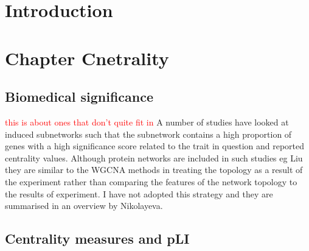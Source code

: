 \section{Introduction}

\section{Chapter Cnetrality}

\cite{newman2003social}
\cite{vasques2020transitivity}


\subsection{Biomedical significance}
\textcolor{red}{this is about ones that don't quite fit in}
A number of studies have looked at induced subnetworks such that the subnetwork contains a high proportion of genes with a high significance score related to the trait in question and reported centrality values. Although protein networks are included in such studies eg Liu they are similar to the WGCNA methods in treating the topology as a result of the experiment rather than comparing the features of the network topology to the results of experiment. I have not adopted this strategy and they are summarised in an overview by Nikolayeva\cite{nikolayeva2018network}.


\subsection{Centrality measures and pLI}

